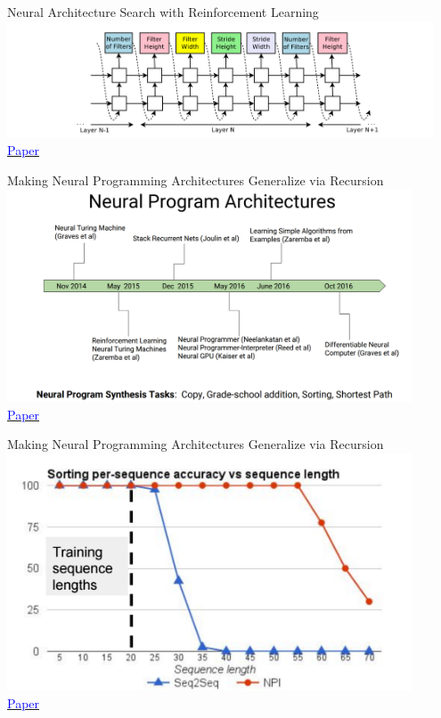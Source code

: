 \documentclass[]{beamer}
\begin{document}
\begin{frame}{Neural Architecture Search with Reinforcement Learning}
\centering
\includegraphics[width=0.95\textwidth]{figures/zoph-controller} \\
\href{https://openreview.net/forum?id=r1Ue8Hcxg}{\textcolor{blue}{Paper}}
\end{frame}

\begin{frame}{Making Neural Programming Architectures Generalize via Recursion}
\centering
\includegraphics[width=0.9\textwidth]{figures/cai-np-architectures} \\
\href{https://openreview.net/forum?id=BkbY4psgg}{\textcolor{blue}{Paper}}
\end{frame}

\begin{frame}{Making Neural Programming Architectures Generalize via Recursion}
\centering
\includegraphics[width=0.9\textwidth]{figures/cai-npi-failure} \\
\href{https://openreview.net/forum?id=BkbY4psgg}{\textcolor{blue}{Paper}}
\end{frame}
\end{document}
